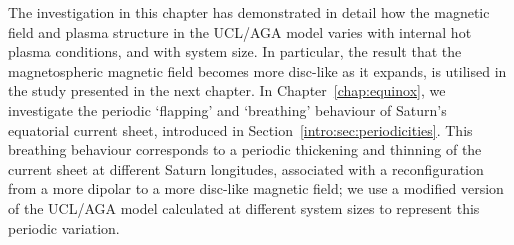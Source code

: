 The investigation in this chapter has demonstrated in detail how the magnetic field and plasma structure in the UCL/AGA model varies with internal hot plasma conditions, and with system size. In particular, the result that the magnetospheric magnetic field becomes more disc-like as it expands, is utilised in the study presented in the next chapter. In Chapter~\ref{chap:equinox}, we investigate the periodic `flapping' and `breathing' behaviour of Saturn's equatorial current sheet, introduced in Section~\ref{intro:sec:periodicities}. This breathing behaviour corresponds to a periodic thickening and thinning of the current sheet at different Saturn longitudes, associated with a reconfiguration from a more dipolar to a more disc-like magnetic field; we use a modified version of the UCL/AGA model calculated at different system sizes to represent this periodic variation.